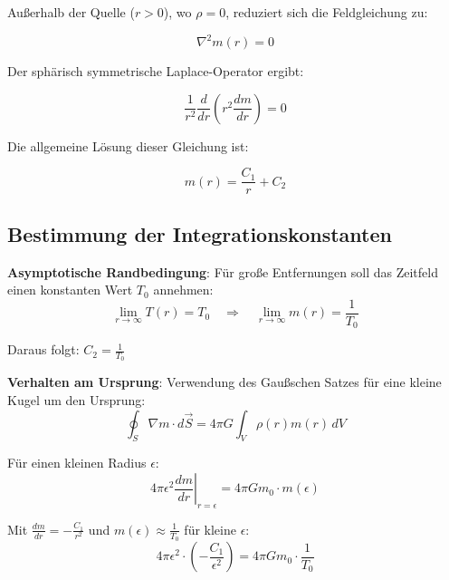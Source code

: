 \documentclass[12pt,a4paper]{article}
\begin{document}
	Außerhalb der Quelle ($r > 0$), wo $\rho = 0$, reduziert sich die Feldgleichung zu:
	
	\begin{equation}
		\nabla^2 m(r) = 0
	\end{equation}
	
	Der sphärisch symmetrische Laplace-Operator \citep{jackson1998,griffiths1999} ergibt:
	
	\begin{equation}
		\frac{1}{r^2}\frac{d}{dr}\left(r^2 \frac{dm}{dr}\right) = 0
	\end{equation}
	
	Die allgemeine Lösung dieser Gleichung ist:
	
	\begin{equation}
		m(r) = \frac{C_1}{r} + C_2
	\end{equation}
	
	\subsection{Bestimmung der Integrationskonstanten}
	\label{subsec:integration_constants}
	
	\textbf{Asymptotische Randbedingung}: Für große Entfernungen soll das Zeitfeld einen konstanten Wert $T_0$ annehmen:
	\begin{equation}
		\lim_{r \to \infty} T(r) = T_0 \quad \Rightarrow \quad \lim_{r \to \infty} m(r) = \frac{1}{T_0}
	\end{equation}
	
	Daraus folgt: $C_2 = \frac{1}{T_0}$
	
	\textbf{Verhalten am Ursprung}: Verwendung des Gaußschen Satzes \citep{griffiths1999,jackson1998} für eine kleine Kugel um den Ursprung:
	\begin{equation}
		\oint_S \nabla m \cdot d\vec{S} = 4\pi G \int_V \rho(r) m(r) \, dV
	\end{equation}
	
	Für einen kleinen Radius $\epsilon$:
	\begin{equation}
		4\pi \epsilon^2 \left.\frac{dm}{dr}\right|_{r=\epsilon} = 4\pi G m_0 \cdot m(\epsilon)
	\end{equation}
	
	Mit $\frac{dm}{dr} = -\frac{C_1}{r^2}$ und $m(\epsilon) \approx \frac{1}{T_0}$ für kleine $\epsilon$:
	\begin{equation}
		4\pi \epsilon^2 \cdot \left(-\frac{C_1}{\epsilon^2}\right) = 4\pi G m_0 \cdot \frac{1}{T_0}
	\end{equation}
	
\end{document}
